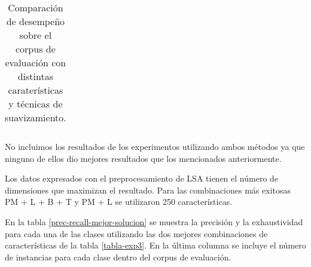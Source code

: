 \begin{table}[h]
\begin{tabular}{l c c | c c}
\end{tabular}
\caption{Comparación de desempeño sobre el corpus de evaluación con distintas caraterísticas y técnicas de suavizamiento.}
\end{table}
No incluimos los resultados de los experimentos utilizando ambos métodos ya que ninguno de ellos dio mejores resultados que los mencionados anteriormente.

Los datos expresados con el preprocesamiento de LSA tienen el número de dimensiones que maximizan el resultado. Para las combinaciones más exitosas PM + L + B + T y PM + L se utilizaron 250 características.

En la tabla \ref{prec-recall-mejor-solucion} se muestra la precisión y la exhaustividad para cada una de las clases utilizando las dos mejores combinaciones de características de la tabla \ref{tabla-exp3}. En la última columna se incluye el número de instancias para cada clase dentro del corpus de evaluación.

